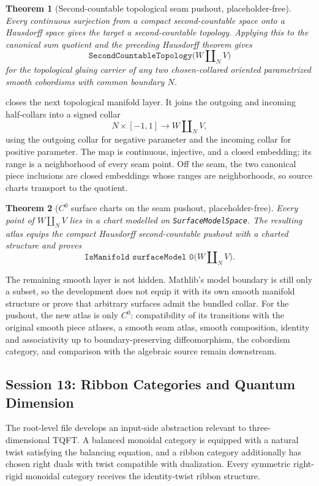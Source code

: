 \documentclass[11pt]{amsart}
\theoremstyle{plain}
\newtheorem{theorem}{Theorem}[section]
\theoremstyle{definition}
\begin{document}
\begin{theorem}[Second-countable topological seam pushout, placeholder-free]
Every continuous surjection from a compact second-countable space onto a
Hausdorff space gives the target a second-countable topology.  Applying this
to the canonical sum quotient and the preceding Hausdorff theorem gives
\[
\texttt{SecondCountableTopology}
  \bigl(W\mathbin{\amalg_N}V\bigr)
\]
for the topological gluing carrier of any two chosen-collared oriented
parametrized smooth cobordisms with common boundary \(N\).
\end{theorem}

 closes the next topological
manifold layer.  It joins the outgoing and incoming half-collars into a signed
collar
\[
N\times[-1,1]\longrightarrow W\mathbin{\amalg_N}V,
\]
using the outgoing collar for negative parameter and the incoming collar for
positive parameter.  The map is continuous, injective, and a closed
embedding; its range is a neighborhood of every seam point.  Off the seam,
the two canonical piece inclusions are closed embeddings whose ranges are
neighborhoods, so source charts transport to the quotient.

\begin{theorem}[$C^0$ surface charts on the seam pushout, placeholder-free]
Every point of \(W\mathbin{\amalg_N}V\) lies in a chart modelled on
\texttt{SurfaceModelSpace}.  The resulting atlas equips the compact Hausdorff
second-countable pushout with a charted structure and proves
\[
\texttt{IsManifold surfaceModel 0}
  \bigl(W\mathbin{\amalg_N}V\bigr).
\]
\end{theorem}

The remaining smooth layer is not hidden. Mathlib's model boundary is still
only a subset, so the development does not equip it with its own smooth
manifold structure or prove that arbitrary surfaces admit the bundled collar.
For the pushout, the new atlas is only $C^0$: compatibility of its transitions
with the original smooth piece atlases, a smooth seam atlas, smooth
composition, identity and associativity up to boundary-preserving
diffeomorphism, the cobordism category, and comparison with the algebraic
source remain downstream.

\subsection{Session 13: Ribbon Categories and Quantum Dimension}

The root-level file  develops an input-side abstraction relevant to three-dimensional TQFT. A balanced monoidal category is equipped with a natural twist satisfying the balancing equation, and a ribbon category additionally has chosen right duals with twist compatible with dualization. Every symmetric right-rigid monoidal category receives the identity-twist ribbon structure.
\end{document}
